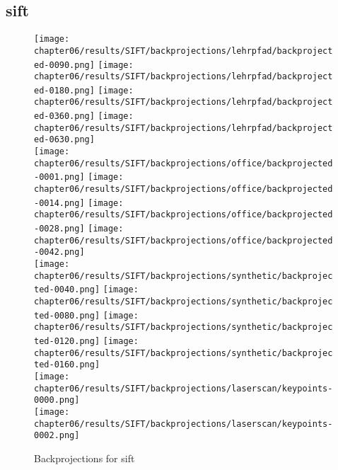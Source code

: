 \subsection{\acrshort{sift}}\label{sec:lehrpfad_conversions}
\begin{figure}[H]
    \texttt{[image: chapter06/results/SIFT/backprojections/lehrpfad/backprojected-0090.png]}%
    \texttt{[image: chapter06/results/SIFT/backprojections/lehrpfad/backprojected-0180.png]}%
    \texttt{[image: chapter06/results/SIFT/backprojections/lehrpfad/backprojected-0360.png]}%
    \texttt{[image: chapter06/results/SIFT/backprojections/lehrpfad/backprojected-0630.png]}\\
    \texttt{[image: chapter06/results/SIFT/backprojections/office/backprojected-0001.png]}%
    \texttt{[image: chapter06/results/SIFT/backprojections/office/backprojected-0014.png]}%
    \texttt{[image: chapter06/results/SIFT/backprojections/office/backprojected-0028.png]}%
    \texttt{[image: chapter06/results/SIFT/backprojections/office/backprojected-0042.png]}\\
    \texttt{[image: chapter06/results/SIFT/backprojections/synthetic/backprojected-0040.png]}%
    \texttt{[image: chapter06/results/SIFT/backprojections/synthetic/backprojected-0080.png]}%
    \texttt{[image: chapter06/results/SIFT/backprojections/synthetic/backprojected-0120.png]}%
    \texttt{[image: chapter06/results/SIFT/backprojections/synthetic/backprojected-0160.png]}\\
    \texttt{[image: chapter06/results/SIFT/backprojections/laserscan/keypoints-0000.png]}\\
    \texttt{[image: chapter06/results/SIFT/backprojections/laserscan/keypoints-0002.png]}\\
    \caption{Backprojections for \acrshort{sift}}
\end{figure}
